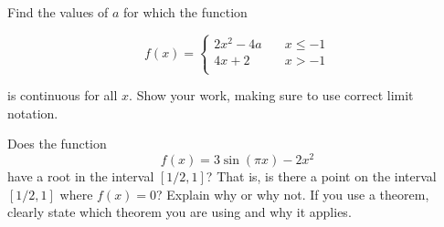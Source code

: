 \documentclass[addpoints,12pt]{exam}
\begin{document}
\begin{questions}
\begin{parts}
\vfill

\end{parts}


\newpage





\question[5] Find the values of $a$ for which the function


$$ f(x) = \left\{
      \begin{array}{ll}
         2x^2 -4a & \quad x \le -1 \\
        4x+2 & \quad x>-1 \\
      \end{array}
  \right. $$

is continuous for all $x.$ Show your work, making sure to use correct limit notation.

\newpage

\question[5] Does the function $$f(x) = 3\sin(\pi x) - 2x^2 $$ have a root in the interval $[1/2 , 1
]$? That is, is there a point on the interval $[1/2,1]$ where $f(x)=0$? Explain why or why not. If
you use a theorem, clearly state which theorem you are using and why it applies.


\newpage




\end{questions}
\end{document}
